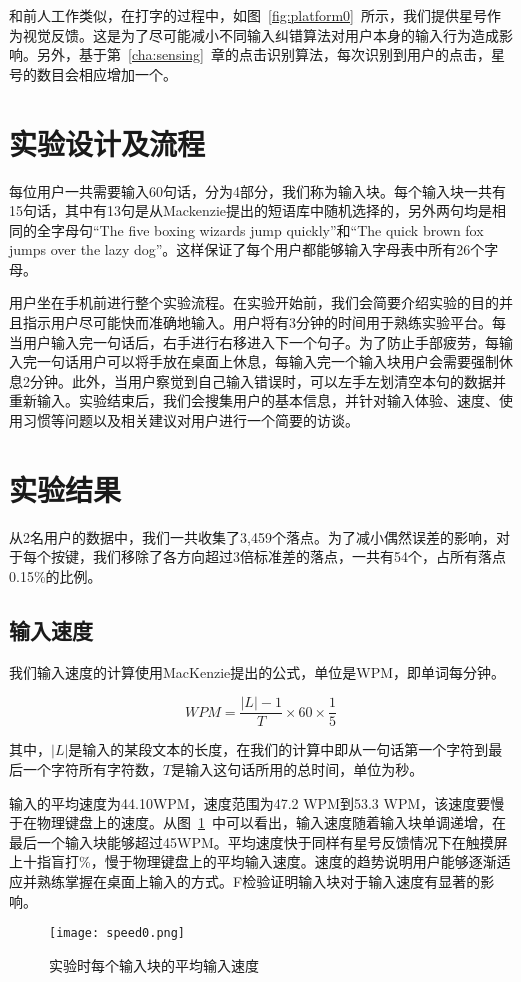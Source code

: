 和前人工作类似\cite{flatglass2011findlater}\cite{2017blindtype}，在打字的过程中，如图~\ref{fig:platform0}~所示，我们提供星号作为视觉反馈。这是为了尽可能减小不同输入纠错算法对用户本身的输入行为造成影响。另外，基于第~\ref{cha:sensing}~章的点击识别算法，每次识别到用户的点击，星号的数目会相应增加一个。


\section{实验设计及流程}
每位用户一共需要输入60句话，分为4部分，我们称为输入块。每个输入块一共有15句话，其中有13句是从Mackenzie提出的短语库\cite{mackenzie2003phrase}中随机选择的，另外两句均是相同的全字母句“The five boxing wizards jump quickly”和“The quick brown fox jumps over the lazy dog”。这样保证了每个用户都能够输入字母表中所有26个字母。

用户坐在手机前进行整个实验流程。在实验开始前，我们会简要介绍实验的目的并且指示用户尽可能快而准确地输入。用户将有3分钟的时间用于熟练实验平台。每当用户输入完一句话后，右手进行右移进入下一个句子。为了防止手部疲劳，每输入完一句话用户可以将手放在桌面上休息，每输入完一个输入块用户会需要强制休息2分钟。此外，当用户察觉到自己输入错误时，可以左手左划清空本句的数据并重新输入。实验结束后，我们会搜集用户的基本信息，并针对输入体验、速度、使用习惯等问题以及相关建议对用户进行一个简要的访谈。

\section{实验结果}
从2名用户的数据中，我们一共收集了3,459个落点。为了减小偶然误差的影响，对于每个按键，我们移除了各方向超过3倍标准差的落点，一共有54个，占所有落点0.15\%的比例。

\subsection{输入速度} %
我们输入速度的计算使用MacKenzie提出的公式\cite{speedcalc}，单位是WPM，即单词每分钟。

\begin{equation}
    \label{equ:calcspeed}
    WPM = \frac{|L|-1}{T} \times 60 \times \frac{1}{5}
\end{equation}

其中，$|L|$是输入的某段文本的长度，在我们的计算中即从一句话第一个字符到最后一个字符所有字符数，$T$是输入这句话所用的总时间，单位为秒。

输入的平均速度为44.10WPM，速度范围为47.2 WPM到53.3 WPM，该速度要慢于在物理键盘上的速度。从图~\ref{fig:speed0}~中可以看出，输入速度随着输入块单调递增，在最后一个输入块能够超过45WPM。平均速度快于同样有星号反馈情况下在触摸屏上十指盲打\%\cite{flatglass2011findlater}，慢于物理键盘上的平均输入速度。速度的趋势说明用户能够逐渐适应并熟练掌握在桌面上输入的方式。F检验证明输入块对于输入速度有显著的影响。
\begin{figure}[h] %
    \centering
    \texttt{[image: speed0.png]}
    \caption{实验时每个输入块的平均输入速度}
    \label{fig:speed0}
\end{figure}

